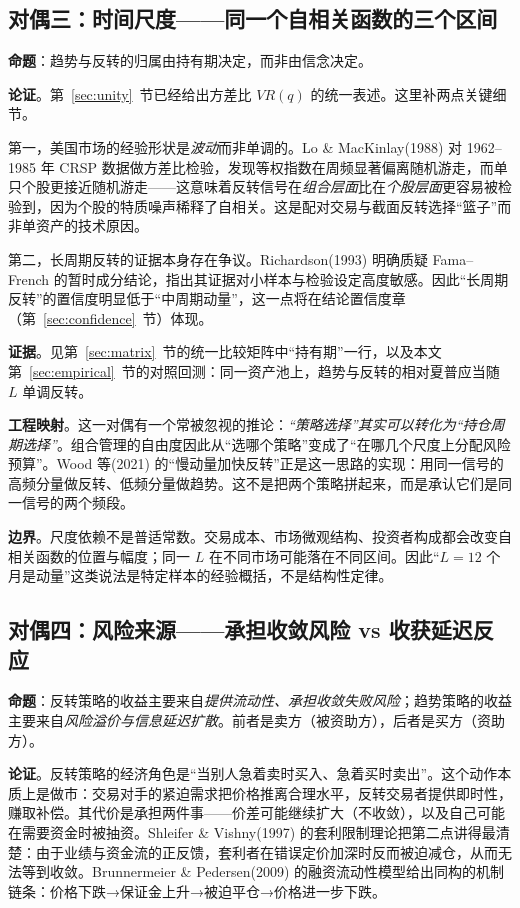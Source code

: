 \subsection{对偶三：时间尺度——同一个自相关函数的三个区间}

\textbf{命题}：趋势与反转的归属由持有期决定，而非由信念决定。

\textbf{论证}。第~\ref{sec:unity}~节已经给出方差比 $VR(q)$ 的统一表述。这里补两点关键细节。

第一，美国市场的经验形状是\emph{波动}而非单调的。Lo \& MacKinlay(1988) 对 1962--1985 年 CRSP 数据做方差比检验，发现等权指数在周频显著偏离随机游走，而单只个股更接近随机游走\cite{lomackinlay1988}——这意味着反转信号在\emph{组合层面}比在\emph{个股层面}更容易被检验到，因为个股的特质噪声稀释了自相关。这是配对交易与截面反转选择“篮子”而非单资产的技术原因。

第二，长周期反转的证据本身存在争议。Richardson(1993) 明确质疑 Fama--French 的暂时成分结论，指出其证据对小样本与检验设定高度敏感\cite{richardson1993}。因此“长周期反转”的置信度明显低于“中周期动量”，这一点将在结论置信度章（第~\ref{sec:confidence}~节）体现。

\textbf{证据}。见第~\ref{sec:matrix}~节的统一比较矩阵中“持有期”一行，以及本文第~\ref{sec:empirical}~节的对照回测：同一资产池上，趋势与反转的相对夏普应当随 $L$ 单调反转。

\textbf{工程映射}。这一对偶有一个常被忽视的推论：\emph{“策略选择”其实可以转化为“持仓周期选择”}。组合管理的自由度因此从“选哪个策略”变成了“在哪几个尺度上分配风险预算”。Wood 等(2021) 的“慢动量加快反转”正是这一思路的实现：用同一信号的高频分量做反转、低频分量做趋势\cite{wood2021}。这不是把两个策略拼起来，而是承认它们是同一信号的两个频段。

\textbf{边界}。尺度依赖不是普适常数。交易成本、市场微观结构、投资者构成都会改变自相关函数的位置与幅度；同一 $L$ 在不同市场可能落在不同区间。因此“$L=12$ 个月是动量”这类说法是特定样本的经验概括，不是结构性定律。

\subsection{对偶四：风险来源——承担收敛风险 vs 收获延迟反应}

\textbf{命题}：反转策略的收益主要来自\emph{提供流动性、承担收敛失败风险}；趋势策略的收益主要来自\emph{风险溢价与信息延迟扩散}。前者是卖方（被资助方），后者是买方（资助方）。

\textbf{论证}。反转策略的经济角色是“当别人急着卖时买入、急着买时卖出”。这个动作本质上是做市：交易对手的紧迫需求把价格推离合理水平，反转交易者提供即时性，赚取补偿。其代价是承担两件事——价差可能继续扩大（不收敛），以及自己可能在需要资金时被抽资。Shleifer \& Vishny(1997) 的套利限制理论把第二点讲得最清楚：由于业绩与资金流的正反馈，套利者在错误定价加深时反而被迫减仓，从而无法等到收敛\cite{shleifervishny1997}。Brunnermeier \& Pedersen(2009) 的融资流动性模型给出同构的机制链条：价格下跌→保证金上升→被迫平仓→价格进一步下跌\cite{brunnermeier2009}。

